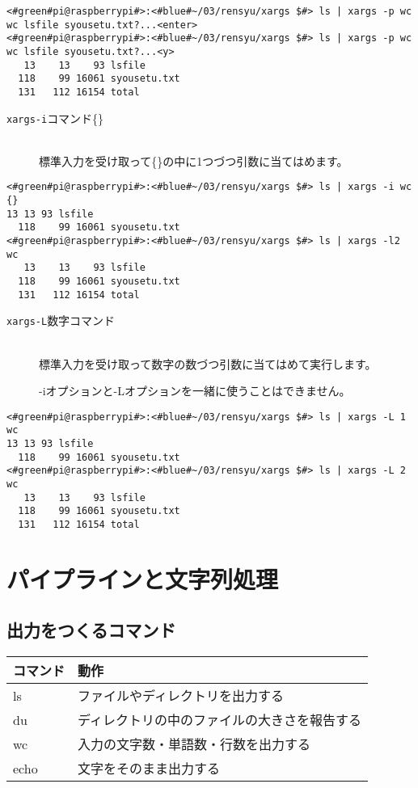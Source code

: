\begin{lstlisting}[caption=xargsコマンドのオプションp]
<#green#pi@raspberrypi#>:<#blue#~/03/rensyu/xargs $#> ls | xargs -p wc
wc lsfile syousetu.txt?...<enter>
<#green#pi@raspberrypi#>:<#blue#~/03/rensyu/xargs $#> ls | xargs -p wc
wc lsfile syousetu.txt?...<y>
   13    13    93 lsfile
  118    99 16061 syousetu.txt
  131   112 16154 total
\end{lstlisting}

\begin{description}
\item[\texttt{xargs}\textvisiblespace \texttt{-i}\textvisiblespace コマンド\textvisiblespace \{\}]\mbox{}\\
標準入力を受け取って\{\}の中に1つづつ引数に当てはめます。
\end{description}

\begin{lstlisting}[caption=xargsコマンドのオプションi]
<#green#pi@raspberrypi#>:<#blue#~/03/rensyu/xargs $#> ls | xargs -i wc  {}
13 13 93 lsfile
  118    99 16061 syousetu.txt
<#green#pi@raspberrypi#>:<#blue#~/03/rensyu/xargs $#> ls | xargs -l2 wc
   13    13    93 lsfile
  118    99 16061 syousetu.txt
  131   112 16154 total
\end{lstlisting}

\begin{description}
\item[\texttt{xargs}\textvisiblespace \texttt{-L}\textvisiblespace 数字\textvisiblespace コマンド]\mbox{}\\
標準入力を受け取って数字の数づつ引数に当てはめて実行します。

-iオプションと-Lオプションを一緒に使うことはできません。
\end{description}

\begin{lstlisting}[caption=xargsコマンドのオプションL]
<#green#pi@raspberrypi#>:<#blue#~/03/rensyu/xargs $#> ls | xargs -L 1 wc
13 13 93 lsfile
  118    99 16061 syousetu.txt
<#green#pi@raspberrypi#>:<#blue#~/03/rensyu/xargs $#> ls | xargs -L 2 wc
   13    13    93 lsfile
  118    99 16061 syousetu.txt
  131   112 16154 total
\end{lstlisting}

\section{パイプラインと文字列処理}

\subsection{出力をつくるコマンド}
\begin{tabular}{ll}
    コマンド & 動作 \\ \hline
    ls & ファイルやディレクトリを出力する \\
    du & ディレクトリの中のファイルの大きさを報告する\\
    wc & 入力の文字数・単語数・行数を出力する\\
    echo & 文字をそのまま出力する\\ \hline
\end{tabular}


